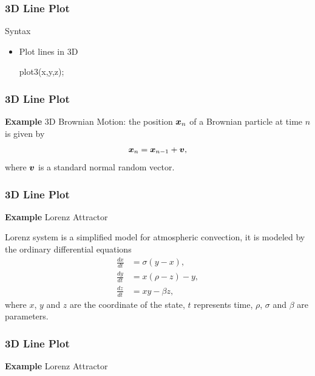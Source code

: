 \documentclass[compress]{beamer}  %
\begin{document}
\begin{frame}[fragile]
\frametitle{3D Line Plot}
\begin{block}{Syntax}
\begin{itemize}
    \item Plot lines in 3D
          \begin{matlabcodebeamer}[numbers=none,frame=none]
          plot3(x,y,z);
          \end{matlabcodebeamer}
\end{itemize}
\end{block}

\end{frame}
\begin{frame}[fragile]
\frametitle{3D Line Plot}
\textbf{Example} 3D Brownian Motion:
the position $\boldsymbol{x}_n$ of a Brownian particle at time $n$ is given by
\begin{equation}
    \boldsymbol{x}_n = \boldsymbol{x}_{n-1} + \boldsymbol{v},
\end{equation}
where $\boldsymbol{v}$ is a standard normal random vector.

\setcounter{subfigure}{0}
\begin{figure}
    \centering
\end{figure}

\end{frame}
\begin{frame}[fragile]
\frametitle{3D Line Plot}
\textbf{Example} Lorenz Attractor

Lorenz system is a simplified model for atmospheric convection, it is modeled by the ordinary differential equations
 \begin{align}
\frac{dx}{dt} &= \sigma (y - x), \\
\frac{dy}{dt} &= x (\rho - z) - y, \\
\frac{dz}{dt} &= x y - \beta z,
\end{align} 
where $x$, $y$ and $z$ are the coordinate of the state, $t$ represents time, $\rho$, $\sigma$ and $\beta$ are parameters.


\end{frame}
\begin{frame}[fragile]
\frametitle{3D Line Plot}
\textbf{Example} Lorenz Attractor

\setcounter{subfigure}{0}
\begin{figure}
    \centering
\end{figure}

\end{frame}
\end{document}
